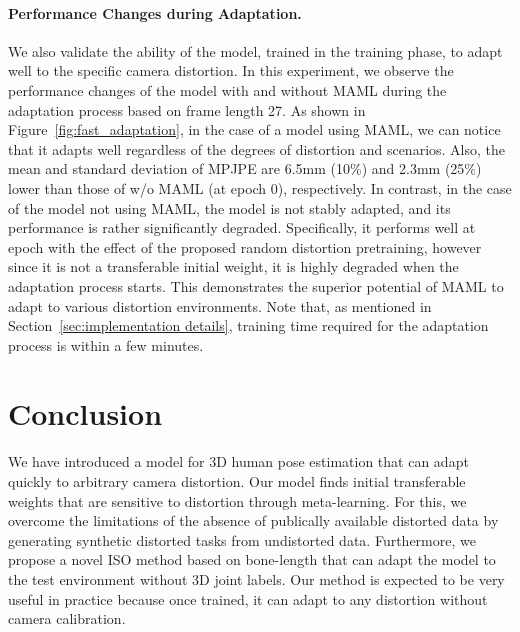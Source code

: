         \paragraph{Performance Changes during Adaptation.}
            We also validate the ability of the model, trained in the training phase, to adapt well to the specific camera distortion. In this experiment, we observe the performance changes of the model with and without MAML during the adaptation process based on frame length 27. As shown in Figure~\ref{fig:fast_adaptation}, in the case of a model using MAML, we can notice that it adapts well regardless of the degrees of distortion and scenarios. Also, the mean and standard deviation of MPJPE are 6.5mm (10\%) and 2.3mm (25\%) lower than those of w/o MAML (at epoch 0), respectively. In contrast, in the case of the model not using MAML, the model is not stably adapted, and its performance is rather significantly degraded. Specifically, it performs well at epoch  with the effect of the proposed random distortion pretraining, however since it is not a transferable initial weight, it is highly degraded when the adaptation process starts. This demonstrates the superior potential of MAML to adapt to various distortion environments. Note that, as mentioned in Section~\ref{sec:implementation details}, training time required for the adaptation process is within a few minutes.
\vspace{-6mm}


\section{Conclusion}
    \vspace{-2mm}
    We have introduced a model for 3D human pose estimation that can adapt quickly to arbitrary camera distortion. Our model finds initial transferable weights that are sensitive to distortion through meta-learning. For this, we overcome the limitations of the absence of publically available distorted data by generating synthetic distorted tasks from undistorted data. Furthermore, we propose a novel ISO method based on bone-length that can adapt the model to the test environment without 3D joint labels. Our method is expected to be very useful in practice because once trained, it can adapt to any distortion without camera calibration.